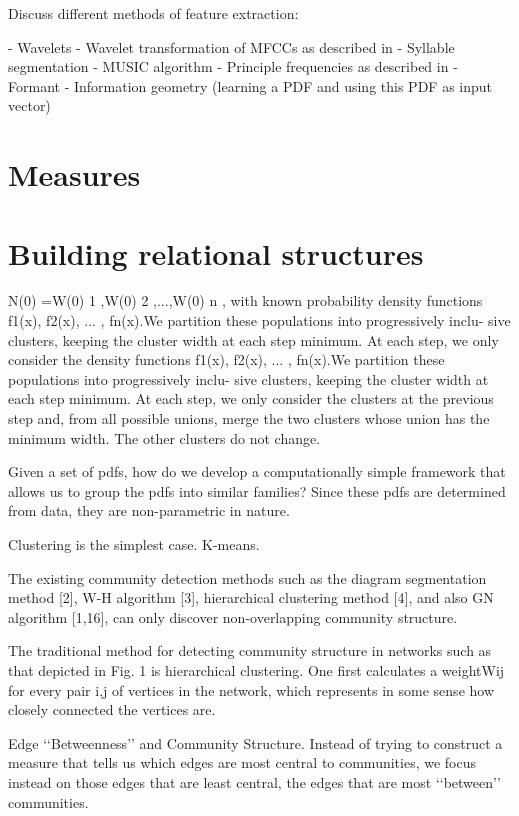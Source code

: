 \documentclass[../main.tex]{subfiles}
\begin{document}
Discuss different methods of feature extraction:

- Wavelets
- Wavelet transformation of MFCCs as described in \cite{Chou2009}
- Syllable segmentation
- MUSIC algorithm
- Principle frequencies as described in \cite{Chou2008}
- Formant
- Information geometry (learning a PDF and using this PDF as input vector)



\section{Measures}\label{measures_review}
\section{Building relational structures}\label{algorithms_review}

\cite{VoVan2010}
N(0) ={W(0)
1 ,W(0) 2 ,...,W(0) n }, with known probability
density functions {f1(x), f2(x), ... , fn(x)}.We partition these populations into progressively inclu- sive clusters, keeping the cluster width at each step minimum. At each step, we only consider the
density functions {f1(x), f2(x), ... , fn(x)}.We partition these populations into progressively inclu- sive clusters, keeping the cluster width at each step minimum. At each step, we only consider the
clusters at the previous step and, from all possible unions, merge the two clusters whose union
has the minimum width. The other clusters do not change.

\cite{Goh2008}
Given a set of pdfs, how do
we develop a computationally simple framework that allows us to group the pdfs into
similar families? Since these pdfs are determined from data, they are non-parametric in
nature.

\cite{hastie2008}
Clustering is the simplest case. K-means. 

\cite{Lu2012}
    The existing community detection methods such as the
diagram segmentation method [2], W-H algorithm [3], hierarchical clustering method [4], and also GN algorithm [1,16], can
only discover non-overlapping community
structure.


\cite{Girvan2002}
The traditional method for detecting community structure in networks such as that depicted in Fig. 1 is
hierarchical clustering. One first calculates a weightWij for every
pair i,j of vertices in the network, which represents in some sense
how closely connected the vertices are.


Edge ‘‘Betweenness’’ and Community Structure.
Instead of trying to construct a measure that tells us which
edges are most central to communities, we focus instead on those
edges that are least central, the edges that are most ‘‘between’’
communities.
\end{document}
